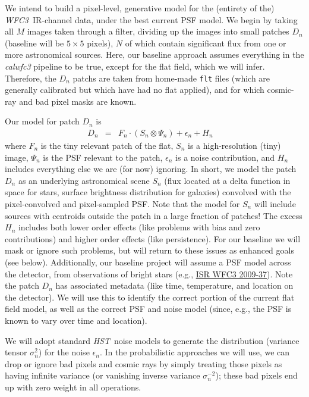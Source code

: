 \documentclass[12pt]{article}
\newcommand{\project}[1]{\textsl{#1}}
\newcommand{\HST}{\project{HST}}
\newcommand{\WFC}{\project{WFC3}}
\begin{document}
We intend to build a pixel-level, generative model
for the (entirety of the) \WFC\ IR-channel data, under the best current PSF model.  We begin by
taking all $M$ images taken through a filter, dividing up the images into
small patches $D_n$ (baseline will be $5 \times 5$ pixels), $N$ of which contain
significant flux from one or more astronomical sources.  Here, our baseline approach assumes
everything in the \textsl{calwfc3} pipeline to be true, except for the
flat field, which we will infer.  Therefore, the $D_n$ patchs are taken
from home-made \texttt{flt} files (which are generally calibrated but which have had no flat applied), and for
which cosmic-ray and bad pixel masks are known.

Our model for patch $D_n$ is
\begin{eqnarray}
D_n & = & F_n \cdot (S_n \otimes \Psi_n) + \epsilon_n + H_n
\quad 
\end{eqnarray}
where $F_n$ is the tiny relevant patch of the flat, $S_n$ is a high-resolution (tiny) image, $\Psi_n$
is the PSF relevant to the patch, $\epsilon_n$ is a noise
contribution, and $H_n$ includes everything else we are (for now) ignoring.
In short, we model the patch $D_n$ as an underlying astronomical scene
$S_n$ (flux located at a delta function in space for stars, surface
brightness distribution for galaxies) convolved with the
pixel-convolved and pixel-sampled PSF.  Note that the model for $S_n$
will include sources with centroids outside the patch in a large
fraction of patches!  The excess $H_n$ includes both lower order
effects (like problems with bias and zero contributions) and higher order effects
(like persistence).  For our baseline we will mask or ignore such
problems, but will return to these issues as enhanced goals (see below).
Additionally, our baseline project will assume a PSF model across the
detector, from observations of bright stars (e.g.,
\href{http://bit.ly/XFSb1M}{ISR WFC3 2009-37}).  Note the patch $D_n$
has associated metadata (like time, temperature, and location on the
detector).  We will use this to identify the correct portion of the
current flat field model, as well as the correct PSF and noise model
(since, e.g., the PSF is known to vary over time and location).

We will adopt standard \HST\ noise models to generate the distribution
(variance tensor $\sigma_n^2$) for the noise $\epsilon_n$.  In the
probabilistic approaches we will use, we can drop or ignore bad pixels
and cosmic rays by simply treating those pixels as having infinite
variance (or vanishing inverse variance $\sigma_n^{-2}$); these bad
pixels end up with zero weight in all operations.
\end{document}

